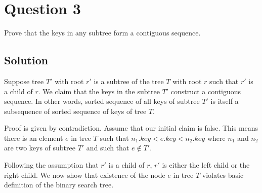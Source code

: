 
\section*{Question 3}

Prove that the keys in any subtree form a contiguous sequence.

\subsection*{Solution}

Suppose tree $T'$ with root $r'$ is a subtree of the tree $T$ with root $r$ such that $r'$ is a child of $r$.
We claim that the keys in the subtree $T'$ construct a contiguous sequence.
In other words, sorted sequence of all keys of subtree $T'$ is itself a subsequence of sorted sequence of keys of tree $T$.

Proof is given by contradiction.
Assume that our initial claim is false.
This means there is an element $e$ in tree $T$ such that $n_1.key < e.key < n_2.key$ where $n_1$ and $n_2$ are two keys of subtree $T'$ and such that $e \notin T'$.

Following the assumption that $r'$ is a child of $r$, $r'$ is either the left child or the right child.
We now show that existence of the node $e$ in tree $T$ violates basic definition of the binary search tree.

